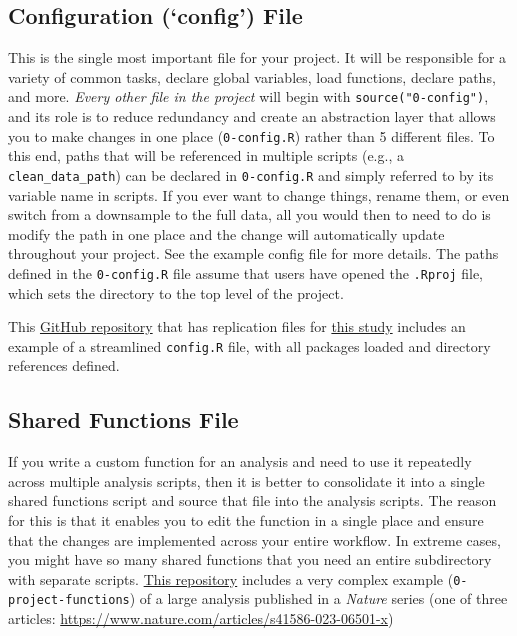 \documentclass[
]{book}
\begin{document}
\subsection{Configuration (`config') File}\label{configuration-config-file}

This is the single most important file for your project. It will be responsible for a variety of common tasks, declare global variables, load functions, declare paths, and more. \emph{Every other file in the project} will begin with \texttt{source("0-config")}, and its role is to reduce redundancy and create an abstraction layer that allows you to make changes in one place (\texttt{0-config.R}) rather than 5 different files. To this end, paths that will be referenced in multiple scripts (e.g., a \texttt{clean\_data\_path}) can be declared in \texttt{0-config.R} and simply referred to by its variable name in scripts. If you ever want to change things, rename them, or even switch from a downsample to the full data, all you would then to need to do is modify the path in one place and the change will automatically update throughout your project. See the example config file for more details. The paths defined in the \texttt{0-config.R} file assume that users have opened the \texttt{.Rproj} file, which sets the directory to the top level of the project.

This \href{https://github.com/jadebc-berkeley/WBB-STH-Kato-Katz}{GitHub repository} that has replication files for \href{https://www.biorxiv.org/content/10.1101/629501v1}{this study} includes an example of a streamlined \texttt{config.R} file, with all packages loaded and directory references defined.

\subsection{Shared Functions File}\label{shared-functions-file}

If you write a custom function for an analysis and need to use it repeatedly across multiple analysis scripts, then it is better to consolidate it into a single shared functions script and source that file into the analysis scripts. The reason for this is that it enables you to edit the function in a single place and ensure that the changes are implemented across your entire workflow. In extreme cases, you might have so many shared functions that you need an entire subdirectory with separate scripts. \href{https://github.com/HBGD-UCB/ki-longitudinal-manuscripts/}{This repository} includes a very complex example (\texttt{0-project-functions}) of a large analysis published in a \emph{Nature} series (one of three articles: \url{https://www.nature.com/articles/s41586-023-06501-x})
\end{document}
